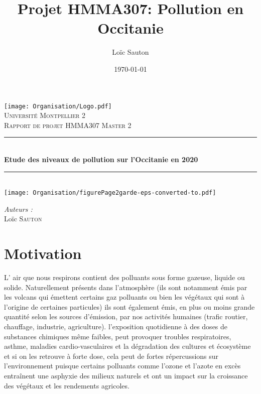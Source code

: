 \documentclass[a4paper,11pt,twoside,openright]{report}
\title{Projet HMMA307: Pollution en Occitanie}
\author{Loïc Sauton}
\date{\today}
\theoremstyle{plain}
\theoremstyle{definition}
\theoremstyle{remark}
\newcommand{\HRule}{\rule{\linewidth}{0.5mm}}
\begin{document}
\pagestyle{empty}
\begin{titlepage}
  \begin{center}
    \vspace*{-2cm}
    \texttt{[image: Organisation/Logo.pdf]}\\[1cm]

    \textsc{\LARGE Université Montpellier 2}\\[1.5cm]

    \textsc{\Large Rapport de projet HMMA307 Master 2}\\[1.5cm]

    \HRule\\[0.4cm]

    {\huge \textbf{Etude des niveaux de pollution sur l'Occitanie en 2020}}\\[0.4cm]
    
    \HRule\\[1.5cm]

    \texttt{[image: Organisation/figurePage2garde-eps-converted-to.pdf]}
    \vfill
    \begin{minipage}{0.4\textwidth}
      \begin{flushleft}
        \large
        \emph{Auteurs :}\\
        Loïc \textsc{Sauton}\\
      \end{flushleft}
    \end{minipage}
  \end{center}
\end{titlepage}

\pagestyle{empty}

\chapter*{Motivation}

L' air que nous respirons contient des polluants sous forme gazeuse, liquide ou solide. Naturellement présents dans l’atmosphère (ils sont notamment émis par les volcans qui émettent certains gaz polluants ou bien les végétaux qui sont à l’origine de certaines particules) ils sont également émis, en plus ou moins grande quantité selon les sources d’émission, par nos activités humaines (trafic routier, chauffage, industrie, agriculture). l’exposition quotidienne à des doses de substances chimiques même faibles, peut provoquer troubles respiratoires, asthme, maladies cardio-vasculaires et la dégradation des cultures et écosystème et si on les retrouve à forte dose, cela peut de fortes répercussions sur l’environnement puisque certains polluants comme l’ozone et l’azote en excès entraînent une asphyxie des milieux naturels et ont un impact sur la croissance des végétaux et les rendements agricoles.
\end{document}
